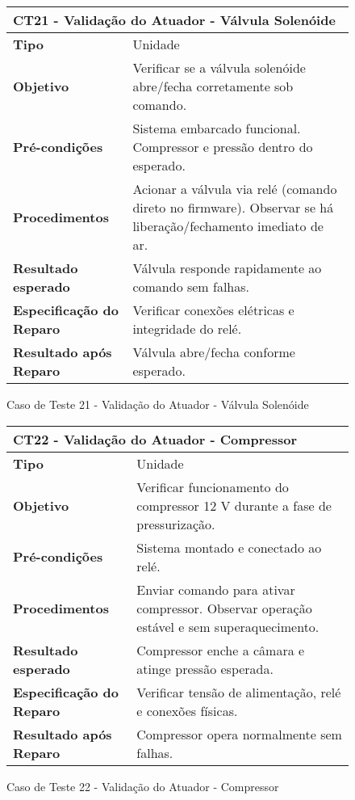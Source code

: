 \begin{figure}[H]
    \centering
\begin{longtable}{|p{}|p{}|}
\hline
\multicolumn{2}{|l|}{\textbf{CT21 - Validação do Atuador - Válvula Solenóide}} \\
\hline
\textbf{Tipo} & Unidade \\
\hline
\textbf{Objetivo} & Verificar se a válvula solenóide abre/fecha corretamente sob comando. \\
\hline
\textbf{Pré-condições} &  Sistema embarcado funcional.  Compressor e pressão dentro do esperado.  \\
\hline
\textbf{Procedimentos} &  Acionar a válvula via relé (comando direto no firmware).  Observar se há liberação/fechamento imediato de ar.  \\
\hline
\textbf{Resultado esperado} & Válvula responde rapidamente ao comando sem falhas. \\
\hline
\textbf{Especificação do Reparo} & Verificar conexões elétricas e integridade do relé. \\
\hline
\textbf{Resultado após Reparo} & Válvula abre/fecha conforme esperado. \\
\hline
\end{longtable}
\caption{Caso de Teste 21 - Validação do Atuador - Válvula Solenóide}
\label{fig_ct18_validacao_atuador_valvula_solenoide}
\end{figure}

\begin{figure}[H]
    \centering
\begin{longtable}{|p{}|p{}|}
\hline
\multicolumn{2}{|l|}{\textbf{CT22 - Validação do Atuador - Compressor}} \\
\hline
\textbf{Tipo} & Unidade \\
\hline
\textbf{Objetivo} & Verificar funcionamento do compressor 12 V durante a fase de pressurização. \\
\hline
\textbf{Pré-condições} & Sistema montado e conectado ao relé. \\
\hline
\textbf{Procedimentos} &  Enviar comando para ativar compressor.  Observar operação estável e sem superaquecimento.  \\
\hline
\textbf{Resultado esperado} & Compressor enche a câmara e atinge pressão esperada. \\
\hline
\textbf{Especificação do Reparo} & Verificar tensão de alimentação, relé e conexões físicas. \\
\hline
\textbf{Resultado após Reparo} & Compressor opera normalmente sem falhas. \\
\hline
\end{longtable}
\caption{Caso de Teste 22 - Validação do Atuador - Compressor}
\label{fig_ct19_validacao_atuador_compressor}
\end{figure}

